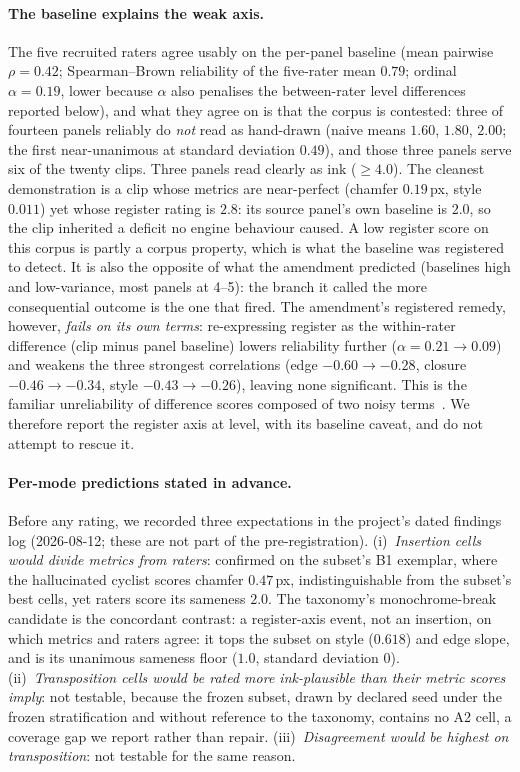 \documentclass[11pt]{article}
\begin{document}
\paragraph{The baseline explains the weak axis.} The five recruited raters
agree usably on the per-panel baseline (mean pairwise $\rho = 0.42$;
Spearman--Brown reliability of the five-rater mean $0.79$; ordinal
$\alpha = 0.19$, lower because $\alpha$ also penalises the between-rater
level differences reported below), and what they
agree on is that the corpus is contested: three of fourteen panels reliably
do \emph{not} read as hand-drawn (naive means $1.60$, $1.80$, $2.00$; the
first near-unanimous at standard deviation $0.49$), and those three panels serve six of the
twenty clips. Three panels read clearly as ink ($\geq 4.0$). The cleanest
demonstration is a clip whose metrics are near-perfect (chamfer
$0.19$\,px, style $0.011$) yet whose register rating is $2.8$: its source
panel's own baseline is $2.0$, so the clip inherited a deficit no engine
behaviour caused. A low register score on this corpus is partly a corpus
property, which is what the baseline was registered to detect.
It is also the opposite of what the amendment predicted (baselines high and
low-variance, most panels at 4--5): the branch it called the more
consequential outcome is the one that fired.
The amendment's registered remedy, however, \emph{fails on its own terms}:
re-expressing register as the within-rater difference (clip minus panel
baseline) lowers reliability further ($\alpha = 0.21 \to 0.09$) and weakens
the three strongest correlations (edge $-0.60 \to -0.28$, closure
$-0.46 \to -0.34$, style $-0.43 \to -0.26$), leaving none significant. This is the familiar unreliability of difference scores
composed of two noisy terms~\cite{cronbach1970change}. We therefore report
the register axis at level, with its baseline caveat, and do not attempt to
rescue it.

\paragraph{Per-mode predictions stated in advance.} Before any rating, we
recorded three expectations in the project's dated findings log (2026-08-12;
these are not part of the pre-registration). (i)~\emph{Insertion cells would divide
metrics from raters}: confirmed on the subset's B1 exemplar, where the
hallucinated cyclist scores chamfer $0.47$\,px, indistinguishable from the
subset's best cells, yet raters score its sameness $2.0$. The taxonomy's monochrome-break
candidate is the concordant contrast: a register-axis event, not an
insertion, on which metrics and raters agree: it tops the subset on style
($0.618$) and edge slope, and is its unanimous sameness floor ($1.0$,
standard deviation $0$). (ii)~\emph{Transposition cells would be rated
more ink-plausible than their metric scores imply}: not testable, because the
frozen subset, drawn by declared seed under the frozen stratification and
without reference to the taxonomy, contains no A2
cell, a coverage gap we report rather than repair. (iii)~\emph{Disagreement
would be highest on transposition}: not testable for the same reason.
\end{document}
